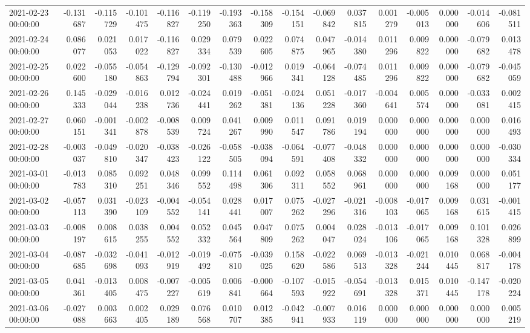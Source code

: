 \begin{tabular}{lrrrrrrrrrrrrrrr}
2021-02-23 00:00:00 & -0.131687 & -0.115729 & -0.101475 & -0.116827 & -0.119250 & -0.193363 & -0.158309 & -0.154151 & -0.069842 & 0.037815 & 0.001279 & -0.005013 & 0.000000 & -0.014606 & -0.081511 \\
2021-02-24 00:00:00 & 0.086077 & 0.021053 & 0.017022 & -0.116827 & 0.029334 & 0.079539 & 0.022605 & 0.074875 & 0.047965 & -0.014380 & 0.011296 & 0.009822 & 0.000000 & -0.079682 & 0.013478 \\
2021-02-25 00:00:00 & 0.022600 & -0.055180 & -0.054863 & -0.129794 & -0.092301 & -0.130488 & -0.012966 & 0.019341 & -0.064128 & -0.074485 & 0.011296 & 0.009822 & 0.000000 & -0.079682 & -0.045059 \\
2021-02-26 00:00:00 & 0.145333 & -0.029044 & -0.016238 & 0.012736 & -0.024441 & 0.019262 & -0.051381 & -0.024136 & 0.051228 & -0.017360 & -0.004641 & 0.005574 & 0.000000 & -0.033081 & 0.002415 \\
2021-02-27 00:00:00 & 0.060151 & -0.001341 & -0.002878 & -0.008539 & 0.009724 & 0.041267 & 0.009990 & 0.011547 & 0.091786 & 0.019194 & 0.000000 & 0.000000 & 0.000000 & 0.000000 & 0.016493 \\
2021-02-28 00:00:00 & -0.003037 & -0.049810 & -0.020347 & -0.038423 & -0.026122 & -0.058505 & -0.038094 & -0.064591 & -0.077408 & -0.048332 & 0.000000 & 0.000000 & 0.000000 & 0.000000 & -0.030334 \\
2021-03-01 00:00:00 & -0.013783 & 0.085310 & 0.092251 & 0.048346 & 0.099552 & 0.114498 & 0.061306 & 0.092311 & 0.058552 & 0.068961 & 0.000000 & 0.000000 & 0.009168 & 0.000000 & 0.051177 \\
2021-03-02 00:00:00 & -0.057113 & 0.031390 & -0.023109 & -0.004552 & -0.054141 & 0.028441 & 0.017007 & 0.075262 & -0.027296 & -0.021316 & -0.008103 & -0.017065 & 0.009168 & 0.031615 & -0.001415 \\
2021-03-03 00:00:00 & -0.008197 & 0.008615 & 0.038255 & 0.004552 & 0.052332 & 0.045564 & 0.047809 & 0.075262 & 0.004047 & 0.028024 & -0.013106 & -0.017065 & 0.009168 & 0.101328 & 0.026899 \\
2021-03-04 00:00:00 & -0.087685 & -0.032698 & -0.041093 & -0.012919 & -0.019492 & -0.075810 & -0.039025 & 0.158620 & -0.022586 & 0.069513 & -0.013328 & -0.021244 & 0.010445 & 0.068817 & -0.004178 \\
2021-03-05 00:00:00 & 0.041361 & -0.013405 & 0.008475 & -0.007227 & -0.005619 & 0.006841 & -0.000664 & -0.107593 & -0.015922 & -0.054691 & -0.013328 & 0.015371 & 0.010445 & -0.147178 & -0.020224 \\
2021-03-06 00:00:00 & -0.027088 & 0.003663 & 0.002405 & 0.029189 & 0.076568 & 0.010707 & 0.012385 & -0.042941 & -0.007933 & 0.016119 & 0.000000 & 0.000000 & 0.000000 & 0.000000 & 0.005219 \\

\end{tabular}
